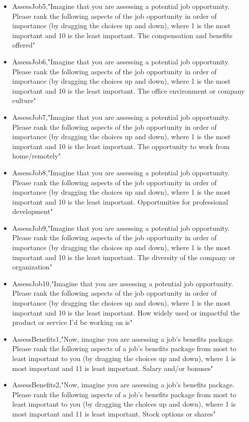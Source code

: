 \begin{appendices}
\begin{itemize}
        \item AssessJob5,"Imagine that you are assessing a potential job opportunity. Please rank the following aspects of the job opportunity in order of importance (by dragging the choices up and down), where 1 is the most important and 10 is the least important. The compensation and benefits offered"
        \item AssessJob6,"Imagine that you are assessing a potential job opportunity. Please rank the following aspects of the job opportunity in order of importance (by dragging the choices up and down), where 1 is the most important and 10 is the least important. The office environment or company culture"
        \item AssessJob7,"Imagine that you are assessing a potential job opportunity. Please rank the following aspects of the job opportunity in order of importance (by dragging the choices up and down), where 1 is the most important and 10 is the least important. The opportunity to work from home/remotely"
        \item AssessJob8,"Imagine that you are assessing a potential job opportunity. Please rank the following aspects of the job opportunity in order of importance (by dragging the choices up and down), where 1 is the most important and 10 is the least important. Opportunities for professional development"
        \item AssessJob9,"Imagine that you are assessing a potential job opportunity. Please rank the following aspects of the job opportunity in order of importance (by dragging the choices up and down), where 1 is the most important and 10 is the least important. The diversity of the company or organization"
        \item AssessJob10,"Imagine that you are assessing a potential job opportunity. Please rank the following aspects of the job opportunity in order of importance (by dragging the choices up and down), where 1 is the most important and 10 is the least important. How widely used or impactful the product or service I'd be working on is"
        \item AssessBenefits1,"Now, imagine you are assessing a job's benefits package. Please rank the following aspects of a job's benefits package from most to least important to you (by dragging the choices up and down), where 1 is most important and 11 is least important. Salary and/or bonuses"
        \item AssessBenefits2,"Now, imagine you are assessing a job's benefits package. Please rank the following aspects of a job's benefits package from most to least important to you (by dragging the choices up and down), where 1 is most important and 11 is least important. Stock options or shares"

\end{itemize}
\end{appendices}
